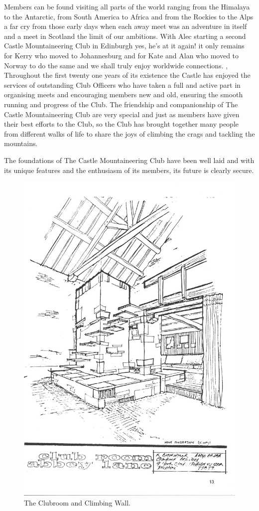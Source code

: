 \documentclass[a5paper,openany,font 10pt]{scrbook}
\begin{document}
Members can be found visiting all parts of the world ranging
from the Himalaya to the Antarctic, from South America to Africa
and from the Rockies to the Alps   a far cry from those early
days when each away meet was an adventure in itself and a meet in
Scotland the limit of our ambitions. With Alec starting a second
Castle Mountaineering Club in Edinburgh   yes, he's at it again!
  it only remains for Kerry  who moved to Johannesburg  and for
Kate and Alan  who moved to Norway  to do the same and we shall
truly enjoy worldwide connections. ,
Throughout the first twenty one years of its existence the
Castle has enjoyed the services of outstanding Club Officers who
have taken a full and active part in organising meets and
encouraging members new and old, ensuring the smooth running and
progress of the Club. The friendship and companionship of The
Castle Mountaineering Club are very special and just as members
have given their best efforts to the Club, so the Club has
brought together many people from different walks of life to
share the joys of climbing the crags and tackling the mountains.

The foundations of The Castle Mountaineering Club have been
well laid and with its unique features and the enthusiasm of its
members, its future is clearly secure.

\begin{figure}[htb]
\centering
\includegraphics[width=.9\linewidth]{./images/Plan1.jpg}
\caption{\label{fig:org794a21d}
The Clubroom and Climbing Wall.}
\end{figure}
\end{document}
